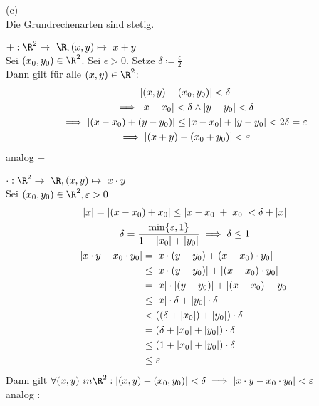 (c)\\
Die Grundrechenarten sind stetig.\\
\begin{bew}
	$+ : \R^2 \rightarrow \R , (x,y) \mapsto x + y$\\
	Sei $(x_0 , y_0 ) \in \R^2$. Sei $\epsilon > 0$. Setze $\delta \coloneqq \frac{\epsilon}{2}$\\
	Dann gilt für alle $(x,y) \in \R^2$:
	\begin{gather*}
		\abs{ (x,y) - (x_0,y_0) } < \delta \\
		\implies \abs{x-x_0} < \delta \wedge \abs{y-y_0} < \delta \\
		\implies \abs{ (x-x_0) + (y-y_0) } \leq \abs{x-x_0} + \abs{y-y_0} < 2 \delta = \epsilon \\
		\implies \abs{ (x+y) - (x_0+y_0)} < \epsilon
	\end{gather*}
	analog $-$
\end{bew}
\begin{bew}
	$\cdot : \R^2 \rightarrow \R , (x,y) \mapsto x \cdot y$\\
	Sei $(x_0,y_0) \in \R^2 , \epsilon > 0$\\
	\begin{gather*}
		\abs{x} = \abs{ (x-x_0) + x_0 } \leq \abs{x-x_0} + \abs{x_0} < \delta + \abs{x} \\%
		\delta = \frac{\min\{\epsilon,1\}}{1 + \abs{x_0} + \abs{y_0}} \implies \delta \leq 1 \\
		\begin{split}
		\abs{x \cdot y - x_0 \cdot y_0}	&= \abs{x \cdot (y-y_0) + (x-x_0) \cdot y_0}					\\
								&\leq \abs{x \cdot (y-y_0)} + \abs{(x-x_0) \cdot y_0}			\\
								&= \abs{x} \cdot \abs{(y-y_0)} + \abs{(x-x_0)} \cdot \abs{y_0}	\\
								&\leq \abs{x} \cdot \delta + \abs{y_0} \cdot \delta				\\
								&< ( ( \delta + \abs{x_0} ) + \abs{y_0} ) \cdot \delta			\\
								&= (\delta + \abs{x_0} + \abs{y_0}) \cdot \delta				\\
								&\leq (1 + \abs{x_0} + \abs{y_0}) \cdot \delta				\\
								&\leq \epsilon										
		\end{split}
	\end{gather*}
	Dann gilt $\forall (x,y) \ in \R^2 : \abs{ (x,y) - (x_0,y_0) } < \delta \implies \abs{ x \cdot y - x_0 \cdot y_0 } < \epsilon$\\
	analog $:$
\end{bew}

